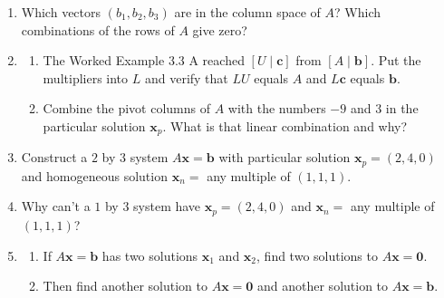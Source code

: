 \documentclass[14pt, a4paper]{article}
\begin{document}
\begin{enumerate}[resume]
    \item Which vectors $(b_1, b_2, b_3)$ are in the column space of $A$? Which combinations of the rows of $A$ give zero?
          \begin{enumerate}

          \end{enumerate}

    \item
          \begin{enumerate}
              \item The Worked Example 3.3 A reached $[U \mid \mathbf{c}]$ from $[A \mid \mathbf{b}]$. Put the multipliers into $L$ and verify that $LU$ equals $A$ and $L\mathbf{c}$ equals $\mathbf{b}$.
              \item Combine the pivot columns of $A$ with the numbers $-9$ and $3$ in the particular solution $\mathbf{x}_p$. What is that linear combination and why?
          \end{enumerate}

    \item Construct a $2$ by $3$ system $A\mathbf{x} = \mathbf{b}$ with particular solution $\mathbf{x}_p = (2,4,0)$ and homogeneous solution $\mathbf{x}_n =$ any multiple of $(1,1,1)$.

    \item Why can't a $1$ by $3$ system have $\mathbf{x}_p = (2,4,0)$ and $\mathbf{x}_n =$ any multiple of $(1,1,1)$?
    \item
          \begin{enumerate}
              \item If $A\mathbf{x} = \mathbf{b}$ has two solutions $\mathbf{x}_1$ and $\mathbf{x}_2$, find two solutions to $A\mathbf{x} = \mathbf{0}$.
              \item Then find another solution to $A\mathbf{x} = \mathbf{0}$ and another solution to $A\mathbf{x} = \mathbf{b}$.
          \end{enumerate}


\end{enumerate}
\end{document}
